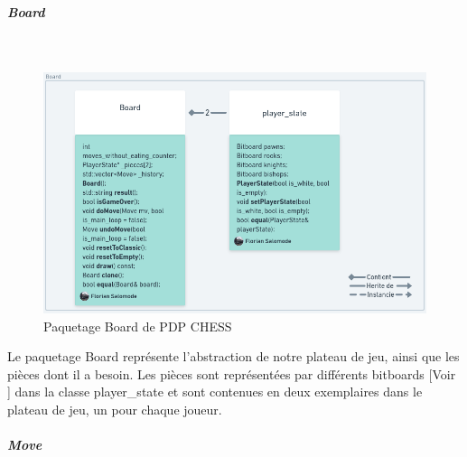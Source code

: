 \documentclass{article}
\begin{document}
\subparagraph{Board}
~~\\
\newline
\begin{figure}[!h]
    \centering
    \includegraphics[scale = 0.4]{img/Package/Board.png}
    \caption{Paquetage Board de PDP CHESS}
    \label{pck:board}
\end{figure}

Le paquetage Board représente l'abstraction de notre plateau de jeu, ainsi que les pièces dont il a besoin.
Les pièces sont représentées par différents bitboards [Voir \cite{Bitboards}] dans la classe player\_state et sont contenues en deux exemplaires dans le plateau de jeu, un pour chaque joueur.
\newpage

\subparagraph{Move}
~~\\
\newline
\end{document}
